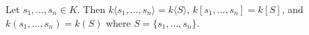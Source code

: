 Let $s_1, \ldots, s_n \in K$. Then $k\langle s_1, \ldots, s_n \rangle = k\langle S \rangle$, $k[s_1, \ldots, s_n] = k[S]$, and $k(s_1, \ldots, s_n) = k(S)$ where $S = \{s_1, \ldots, s_n\}$.
